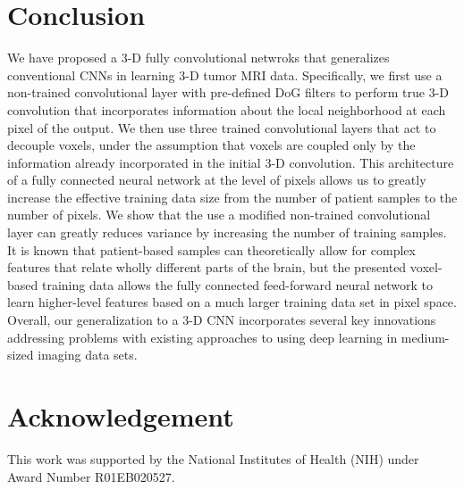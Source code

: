 \documentclass{llncs}
\begin{document}
\section{Conclusion}
We have proposed a 3-D fully convolutional netwroks that generalizes conventional CNNs in learning 3-D tumor MRI data. Specifically, we first use a non-trained convolutional layer with pre-defined DoG filters to perform true 3-D convolution that incorporates information about the local neighborhood at each pixel of the output. We then use three trained convolutional layers that act to decouple voxels, under the assumption that voxels are coupled only by the information already incorporated in the initial 3-D convolution. This architecture of a fully connected neural network at the level of pixels allows us to greatly increase the effective training data size from the number of patient samples to the number of pixels. We show that the use a modified non-trained convolutional layer can greatly reduces variance by increasing the number of training samples. It is known that patient-based samples can theoretically allow for complex features that relate wholly different parts of the brain, but the presented voxel-based training data allows the fully connected feed-forward neural network to learn higher-level features based on a much larger training data set in pixel space. Overall, our generalization to a 3-D CNN incorporates several key innovations addressing problems with existing approaches to using deep learning in medium-sized imaging data sets. 

\section{Acknowledgement}
This work was supported by the National Institutes of Health (NIH) under Award Number R01EB020527. 
\end{document}
